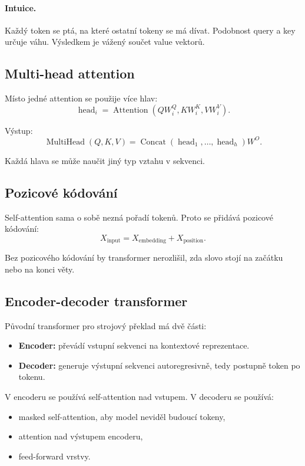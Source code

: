 \paragraph{Intuice.}
Každý token se ptá, na které ostatní tokeny se má dívat. Podobnost query a key určuje váhu. Výsledkem je
vážený součet value vektorů.

\subsection{Multi-head attention}

Místo jedné attention se použije více hlav:
\[
\operatorname{head}_i
=
\operatorname{Attention}
(QW_i^Q,KW_i^K,VW_i^V).
\]

Výstup:
\[
\operatorname{MultiHead}(Q,K,V)
=
\operatorname{Concat}(\operatorname{head}_1,\ldots,\operatorname{head}_h)W^O.
\]

Každá hlava se může naučit jiný typ vztahu v sekvenci.

\subsection{Pozicové kódování}

Self-attention sama o sobě nezná pořadí tokenů. Proto se přidává pozicové kódování:
\[
X_{\text{input}} = X_{\text{embedding}} + X_{\text{position}}.
\]

Bez pozicového kódování by transformer nerozlišil, zda slovo stojí na začátku nebo na konci věty.

\subsection{Encoder-decoder transformer}

Původní transformer pro strojový překlad má dvě části:

\begin{itemize}
    \item \textbf{Encoder:}
    převádí vstupní sekvenci na kontextové reprezentace.
    
    \item \textbf{Decoder:}
    generuje výstupní sekvenci autoregresivně, tedy postupně token po tokenu.
\end{itemize}

V encoderu se používá self-attention nad vstupem. V decoderu se používá:
\begin{itemize}
    \item masked self-attention, aby model neviděl budoucí tokeny,
    \item attention nad výstupem encoderu,
    \item feed-forward vrstvy.
\end{itemize}

